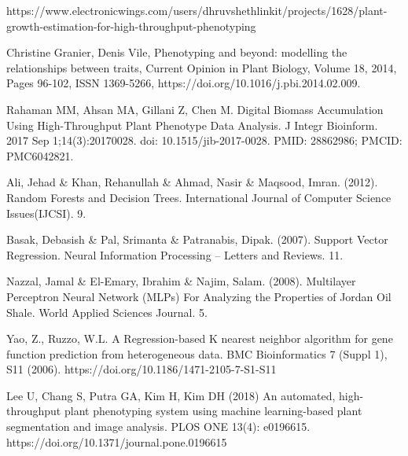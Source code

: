 \documentclass[a4paper,12pt]{report}%
\renewcommand{\\}{\vspace*{0.5\baselineskip} \newline}
\begin{document}
\newpage
\listoffigures{}
\newpage
\listoftables{}






\newpage
\begin{thebibliography}{1}


https://www.electronicwings.com/users/dhruvshethlinkit/projects/1628/plant-growth-estimation-for-high-throughput-phenotyping

Christine Granier, Denis Vile,
Phenotyping and beyond: modelling the relationships between traits,
Current Opinion in Plant Biology,
Volume 18,
2014,
Pages 96-102,
ISSN 1369-5266,
https://doi.org/10.1016/j.pbi.2014.02.009.

Rahaman MM, Ahsan MA, Gillani Z, Chen M. Digital Biomass Accumulation Using High-Throughput Plant Phenotype Data Analysis. J Integr Bioinform. 2017 Sep 1;14(3):20170028. doi: 10.1515/jib-2017-0028. PMID: 28862986; PMCID: PMC6042821.

Ali, Jehad \& Khan, Rehanullah \& Ahmad, Nasir \& Maqsood, Imran. (2012). Random Forests and Decision Trees. International Journal of Computer Science Issues(IJCSI). 9. 

Basak, Debasish \& Pal, Srimanta \& Patranabis, Dipak. (2007). Support Vector Regression. Neural Information Processing – Letters and Reviews. 11. 

Nazzal, Jamal \& El-Emary, Ibrahim \& Najim, Salam. (2008). Multilayer Perceptron Neural Network (MLPs) For Analyzing the Properties of Jordan Oil Shale. World Applied Sciences Journal. 5. 

Yao, Z., Ruzzo, W.L. A Regression-based K nearest neighbor algorithm for gene function prediction from heterogeneous data. BMC Bioinformatics 7 (Suppl 1), S11 (2006). https://doi.org/10.1186/1471-2105-7-S1-S11

Lee U, Chang S, Putra GA, Kim H, Kim DH (2018) An automated, high-throughput plant phenotyping system using machine learning-based plant segmentation and image analysis. PLOS ONE 13(4): e0196615. https://doi.org/10.1371/journal.pone.0196615


\end{thebibliography}
\end{document}
